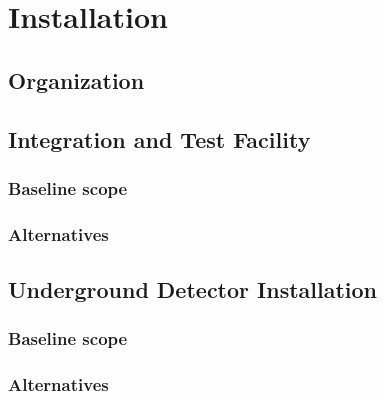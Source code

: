 \section{Installation}
\label{sec:fdsp-coord-install}

\subsection{Organization}
\label{sec:fdsp-coord-org}


\subsection{Integration and Test Facility}
\label{sec:fdsp-coord-integ-test}

\subsubsection{Baseline scope}
\label{sec:fdsp-coord-integ-test-base}

\subsubsection{Alternatives}
\label{sec:fdsp-coord-integ-test-alt}



\subsection{Underground Detector Installation}
\label{sec:fdsp-coord-undergd}


\subsubsection{Baseline scope}
\label{sec:fdsp-coord-undergd-base}


\subsubsection{Alternatives}
\label{sec:fdsp-coord-undergd-alt}

